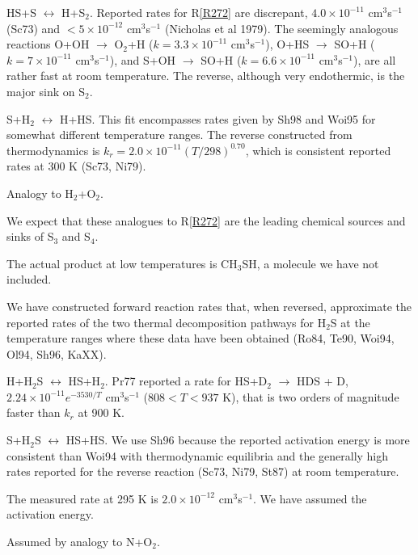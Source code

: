 \documentclass[12pt,landscape]{article}
\newcounter{reaction}
\begin{document}
  HS+S $\!\leftrightarrow\!$ H+S$_2$.  
Reported rates for R\ref{R272} are discrepant, $4.0\times 10^{-11}$ cm$^{3}$s$^{-1}$ (Sc73) and $<\!5\times 10^{-12}$ cm$^{3}$s$^{-1}$ (Nicholas et al 1979). 
The seemingly analogous reactions O+OH $\rightarrow$ O$_2$+H ($k=3.3\times 10^{-11}$ cm$^{3}$s$^{-1}$), O+HS $\rightarrow$ SO+H ( $k=7\times 10^{-11}$ cm$^{3}$s$^{-1}$), and S+OH $\rightarrow$ SO+H ($k=6.6\times 10^{-11}$ cm$^{3}$s$^{-1}$), are all rather fast at room temperature. 
The reverse, although very endothermic, is the major sink on S$_2$.

 S+H$_2$ $\!\leftrightarrow\!$ H+HS. This fit encompasses rates given by Sh98 and Woi95 for somewhat
different temperature ranges.  The reverse constructed from thermodynamics is
 $k_{r} = 2.0\!\times\! 10^{-11}\left(T/298 \right)^{0.70}$, which is  
consistent reported rates at 300 K (Sc73, Ni79).

 Analogy to H$_2$+O$_2$.

We expect that these analogues to R\ref{R272} are the leading chemical sources and sinks of S$_3$ and S$_4$. 
 
   The actual product at low temperatures is CH$_3$SH, a molecule we have not included.
 
  We have constructed forward reaction rates that, when reversed, approximate the
reported rates of the two thermal decomposition pathways for H$_2$S at the temperature ranges where these
data have been obtained (Ro84, Te90, Woi94, Ol94, Sh96, KaXX).

 H+H$_2$S $\!\leftrightarrow\!$ HS+H$_2$.
Pr77 reported a rate for HS+D$_2$ $\rightarrow$ HDS + D, $2.24\!\times\! 10^{-11} e^{-3530/T}$ cm$^{3}$s$^{-1}$ ($808<T<937$ K), that is two orders of magnitude faster than $k_{r}$ at 900 K.   

 S+H$_2$S $\!\leftrightarrow\!$ HS+HS.
We use Sh96 because the reported activation energy is more consistent than Woi94 with thermodynamic equilibria
and the generally high rates reported for the reverse reaction (Sc73, Ni79, St87) at room temperature.

 The measured rate at 295 K is $ 2.0\!\times\! 10^{-12}$ cm$^3$s$^{-1}$.  We have assumed the activation energy.
 
  Assumed by analogy to N+O$_2$.
\end{document}
